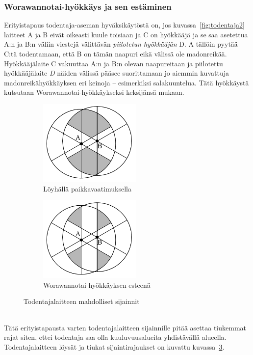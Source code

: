 \documentclass[finnish]{tktltiki2}
\theoremstyle{definition}
\theoremstyle{remark}
\begin{document}
\subsubsection{Worawannotai-hyökkäys ja sen estäminen}

Erityistapaus todentaja-aseman hyväksikäytöstä on, jos kuvassa~\ref{fig:todentaja2} laitteet A ja B eivät oikeasti kuule toisiaan ja C on hyökkääjä ja se saa asetettua A:n ja B:n väliin viestejä välittävän \emph{piilotetun hyökkääjän} D. A tällöin pyytää C:tä todentamaan, että B on tämän naapuri eikä välissä ole madonreikää. Hyökkääjälaite C vakuuttaa A:n ja B:n olevan naapureitaan ja piilotettu hyökkääjälaite \emph{D} näiden välissä pääsee suorittamaan jo aiemmin kuvattuja madonreikähyökkäyksen eri keinoja -- esimerkiksi salakuuntelua. Tätä hyökkäystä kutsutaan Worawannotai-hyökkäykseksi keksijänsä mukaan.

\begin{figure}[!ht]
\begin{subfigure}{.5\textwidth}
  \centering
  \includegraphics[width=5cm]{verifier-loose}
  \caption{Löyhällä paikkavaatimuksella}
  \label{fig:sub1}
\end{subfigure}%
\begin{subfigure}{.5\textwidth}
  \centering
  \includegraphics[width=5cm]{verifier-strict}
  \caption{Worawannotai-hyökkäyksen esteenä}
  \label{fig:sub2}
\end{subfigure}%
\caption{Todentajalaitteen mahdolliset sijainnit}
\label{fig:worawannotai}
\end{figure}

\noindent \\
Tätä erityistapausta varten todentajalaitteen sijainnille pitää asettaa tiukemmat rajat siten, ettei todentaja saa olla kuuluvuusalueita yhdistävällä alueella. Todentajalaitteen löysät ja tiukat sijaintirajaukset on kuvattu kuvassa~\ref{fig:worawannotai}.
\end{document}

